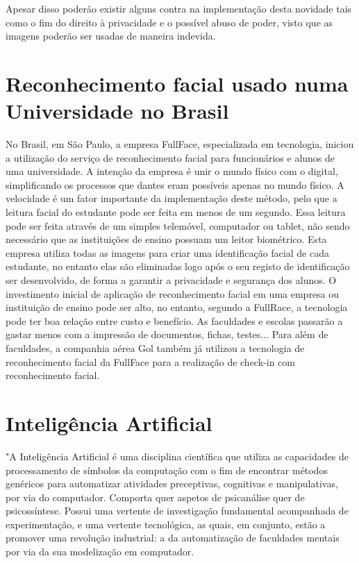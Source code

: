 \documentclass{article}
\begin{document}
Apesar disso poderão existir alguns contra na implementação desta novidade tais como o fim do direito à privacidade e o possível abuso de poder, visto que as imagens poderão ser usadas de maneira indevida. 

  

  

\section{Reconhecimento facial usado numa Universidade no Brasil} 

No Brasil, em São Paulo, a empresa FullFace, especializada em tecnologia, iniciou a utilização do serviço de reconhecimento facial para funcionários e alunos de uma universidade.  
A intenção da empresa é unir o mundo físico com o digital, simplificando os processos que dantes eram possíveis apenas no mundo físico. A velocidade é um fator importante da implementação deste método, pelo que a leitura facial do estudante pode ser feita em menos de um segundo. Essa leitura pode ser feita através de um simples telemóvel, computador ou tablet, não sendo necessário que as instituições de ensino possuam um leitor biométrico. 
Esta empresa utiliza todas as imagens para criar uma identificação facial de cada estudante, no entanto elas são eliminadas logo após o seu registo de identificação ser desenvolvido, de forma a garantir a privacidade e segurança dos alunos. 
O investimento inicial de aplicação de reconhecimento facial em uma empresa ou instituição de ensino pode ser alto, no entanto, segundo a FullRace, a tecnologia pode ter boa relação entre custo e benefício. As faculdades e escolas passarão a gastar menos com a impressão de documentos, fichas, testes... 
Para além de faculdades, a companhia aérea Gol também já utilizou a tecnologia de reconhecimento facial da FullFace para a realização de check-in com reconhecimento facial. \cite{h}\cite{l} 

\section{Inteligência Artificial} 

"A Inteligência Artificial é uma disciplina científica que utiliza as capacidades de processamento de símbolos da computação com o fim de encontrar métodos genéricos para automatizar atividades preceptivas, cognitivas e manipulativas, por via do computador. Comporta quer aspetos de psicanálise quer de psicossíntese. Possui uma vertente de investigação fundamental acompanhada de experimentação, e uma vertente tecnológica, as quais, em conjunto, estão a promover uma revolução industrial: a da automatização de faculdades mentais por via da sua modelização em computador. 
\end{document}
